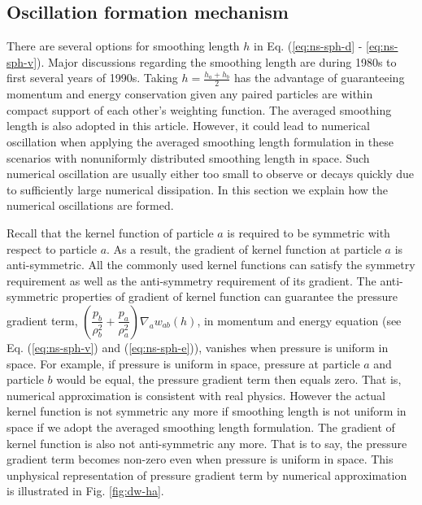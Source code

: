 \documentclass[preprint,12pt,authoryear]{elsarticle}
\begin{document}
\subsection{Oscillation formation mechanism}
There are several options \citep[][e.g.]{evrard1988beyond, hernquist1989treesph} for smoothing length $h$ in Eq. (\ref{eq:ns-sph-d} - \ref{eq:ns-sph-v}). Major discussions regarding the smoothing length are during 1980s to first several years of 1990s. Taking $h=\frac{h_a + h_b}{2}$ has the advantage of guaranteeing momentum and energy conservation given any paired particles are within compact support of each other's weighting function. The averaged smoothing length is also adopted in this article. However, it could lead to numerical oscillation when applying the averaged smoothing length formulation in these scenarios with nonuniformly distributed smoothing length in space. Such numerical oscillation are usually either too small to observe or decays quickly due to sufficiently large numerical dissipation. In this section we explain how the numerical oscillations are formed.

Recall that the kernel function of particle $a$ is required to be symmetric with respect to particle $a$. As a result, the gradient of kernel function at particle $a$ is anti-symmetric. All the commonly used kernel functions can satisfy the symmetry requirement as well as the anti-symmetry requirement of its gradient. The anti-symmetric properties of gradient of kernel function can guarantee the pressure gradient term, $\left(\dfrac{p_b}{\rho_b^2} + \dfrac{p_a}{\rho_a^2}\right) \nabla_a w_{a b}\left(h\right)$,  in momentum and energy equation (see Eq. (\ref{eq:ns-sph-v}) and (\ref{eq:ns-sph-e})), vanishes when pressure is uniform in space. For example, if pressure is uniform in space, pressure at particle $a$ and particle $b$ would be equal, the pressure gradient term then equals zero. That is, numerical approximation is consistent with real physics. However the actual kernel function is not symmetric any more if smoothing length is not uniform in space if we adopt the averaged smoothing length formulation. The gradient of kernel function is also not anti-symmetric any more. That is to say, the pressure gradient term becomes non-zero even when pressure is uniform in space. This unphysical representation of pressure gradient term by numerical approximation is illustrated in Fig. \ref{fig:dw-ha}. 
\end{document}
